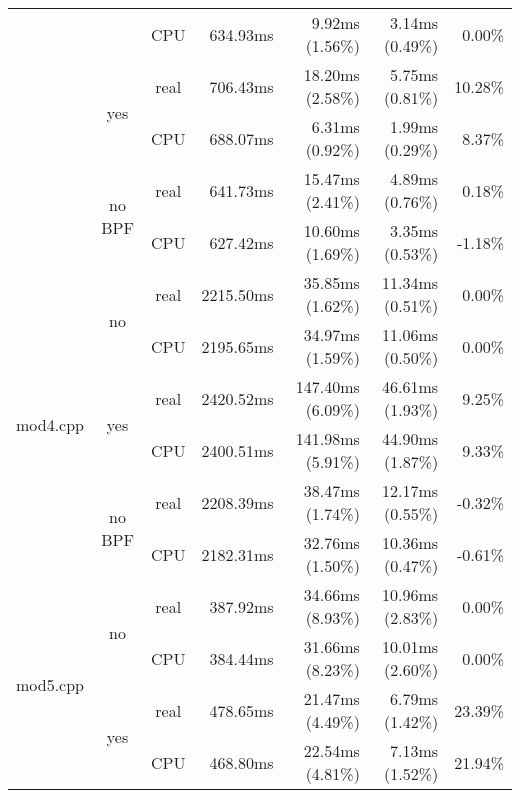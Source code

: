 \documentclass[en]{pracamgr}
\begin{document}
\begin{small}
\begin{longtable}{|l|c|c|r|r|r|r|}
                            &                         & CPU  & 634.93ms & 9.92ms (1.56\%) & 3.14ms (0.49\%) & 0.00\% \\*
                            \cline{2-7}
                            & \multirow{2}{*}{yes}    & real & 706.43ms & 18.20ms (2.58\%) & 5.75ms (0.81\%) & 10.28\% \\*
                            &                         & CPU  & 688.07ms & 6.31ms (0.92\%) & 1.99ms (0.29\%) & 8.37\% \\*
                            \cline{2-7}
                            & \multirow{2}{*}{no BPF} & real & 641.73ms & 15.47ms (2.41\%) & 4.89ms (0.76\%) & 0.18\% \\*
                            &                         & CPU  & 627.42ms & 10.60ms (1.69\%) & 3.35ms (0.53\%) & -1.18\% \\
\hline
\multirow{6}{*}{mod4.cpp}   & \multirow{2}{*}{no}     & real & 2215.50ms & 35.85ms (1.62\%) & 11.34ms (0.51\%) & 0.00\% \\*
                            &                         & CPU  & 2195.65ms & 34.97ms (1.59\%) & 11.06ms (0.50\%) & 0.00\% \\*
                            \cline{2-7}
                            & \multirow{2}{*}{yes}    & real & 2420.52ms & 147.40ms (6.09\%) & 46.61ms (1.93\%) & 9.25\% \\*
                            &                         & CPU  & 2400.51ms & 141.98ms (5.91\%) & 44.90ms (1.87\%) & 9.33\% \\*
                            \cline{2-7}
                            & \multirow{2}{*}{no BPF} & real & 2208.39ms & 38.47ms (1.74\%) & 12.17ms (0.55\%) & -0.32\% \\*
                            &                         & CPU  & 2182.31ms & 32.76ms (1.50\%) & 10.36ms (0.47\%) & -0.61\% \\
\hline
\multirow{6}{*}{mod5.cpp}   & \multirow{2}{*}{no}     & real & 387.92ms & 34.66ms (8.93\%) & 10.96ms (2.83\%) & 0.00\% \\*
                            &                         & CPU  & 384.44ms & 31.66ms (8.23\%) & 10.01ms (2.60\%) & 0.00\% \\*
                            \cline{2-7}
                            & \multirow{2}{*}{yes}    & real & 478.65ms & 21.47ms (4.49\%) & 6.79ms (1.42\%) & 23.39\% \\*
                            &                         & CPU  & 468.80ms & 22.54ms (4.81\%) & 7.13ms (1.52\%) & 21.94\% \\*

\end{longtable}
\end{small}
\end{document}
